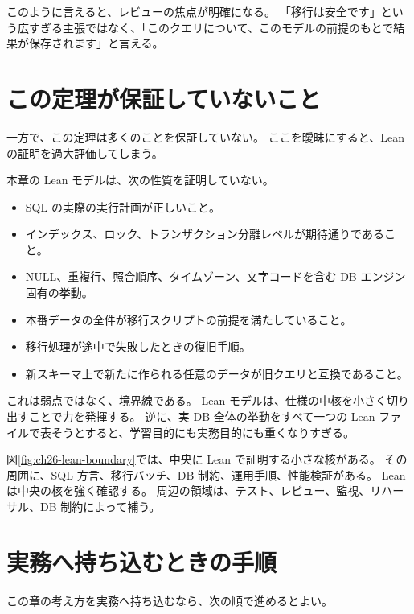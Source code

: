 このように言えると、レビューの焦点が明確になる。
「移行は安全です」という広すぎる主張ではなく、「このクエリについて、このモデルの前提のもとで結果が保存されます」と言える。

\section{この定理が保証していないこと}

一方で、この定理は多くのことを保証していない。
ここを曖昧にすると、Lean の証明を過大評価してしまう。

\begin{warningbox}
本章の Lean モデルは、次の性質を証明していない。
\begin{itemize}
\item SQL の実際の実行計画が正しいこと。
\item インデックス、ロック、トランザクション分離レベルが期待通りであること。
\item NULL、重複行、照合順序、タイムゾーン、文字コードを含む DB エンジン固有の挙動。
\item 本番データの全件が移行スクリプトの前提を満たしていること。
\item 移行処理が途中で失敗したときの復旧手順。
\item 新スキーマ上で新たに作られる任意のデータが旧クエリと互換であること。
\end{itemize}
\end{warningbox}

これは弱点ではなく、境界線である。
Lean モデルは、仕様の中核を小さく切り出すことで力を発揮する。
逆に、実 DB 全体の挙動をすべて一つの Lean ファイルで表そうとすると、学習目的にも実務目的にも重くなりすぎる。


図\ref{fig:ch26-lean-boundary}では、中央に Lean で証明する小さな核がある。
その周囲に、SQL 方言、移行バッチ、DB 制約、運用手順、性能検証がある。
Lean は中央の核を強く確認する。
周辺の領域は、テスト、レビュー、監視、リハーサル、DB 制約によって補う。

\section{実務へ持ち込むときの手順}

この章の考え方を実務へ持ち込むなら、次の順で進めるとよい。

